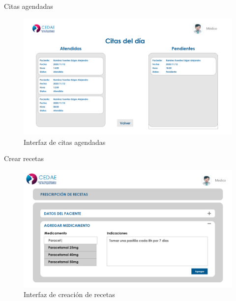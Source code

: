 \documentclass[12pt,letterpaper]{article}
\begin{document}
        Citas agendadas
            \begin{figure}[H]
                \centering
                \includegraphics [scale=0.2]{med_ver_citas}
                \caption{Interfaz de citas agendadas}
            \end{figure}
        Crear recetas
            \begin{figure}[H]
                \centering
                \includegraphics [scale=0.2]{med_crear_receta}
                \caption{Interfaz de creación de recetas}
            \end{figure}
\end{document}
